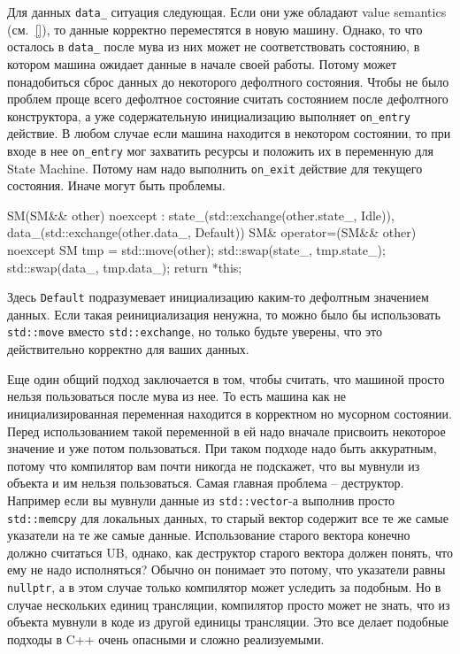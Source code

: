 \documentclass{article}
\begin{document}
{Для данных \verb"data_" ситуация следующая.
Если они уже обладают value semantics (см.~\ref{}), то данные корректно переместятся в новую машину.
Однако, то что осталось в \verb"data_" после мува из них может не соответствовать состоянию, в котором машина ожидает данные в начале своей работы.
Потому может понадобиться сброс данных до некоторого дефолтного состояния.
Чтобы не было проблем проще всего дефолтное состояние считать состоянием после дефолтного конструктора, а уже содержательную инициализацию выполняет \verb"on_entry" действие.
В любом случае если машина находится в некотором состоянии, то при входе в нее \verb"on_entry" мог захватить ресурсы и положить их в переменную для State Machine.
Потому нам надо выполнить \verb"on_exit" действие для текущего состояния.
Иначе могут быть проблемы.
\begin{cppcode}
SM(SM&& other) noexcept 
    : state_(std::exchange(other.state_, Idle{})),
      data_(std::exchange(other.data_, Default{})) {
}
SM& operator=(SM&& other) noexcept {
  SM tmp = std::move(other);
  std::swap(state_, tmp.state_);
  std::swap(data_, tmp.data_);
  return *this;
}
\end{cppcode}
Здесь \verb"Default" подразумевает инициализацию каким-то дефолтным значением данных.
Если такая реинициализация ненужна, то можно было бы использовать  \verb"std::move" вместо \verb"std::exchange", но только будьте уверены, что это действительно корректно для ваших данных.

Еще один общий подход заключается в том, чтобы считать, что  машиной просто нельзя пользоваться после мува из нее.
То есть машина как не инициализированная переменная находится в корректном но мусорном состоянии.
Перед использованием такой переменной в ей надо вначале присвоить некоторое значение и уже потом пользоваться.
При таком подходе надо быть аккуратным, потому что компилятор вам почти никогда не подскажет, что вы мувнули из объекта и им нельзя пользоваться.
Самая главная проблема -- деструктор.
Например если вы мувнули данные из \verb"std::vector"-а выполнив просто \verb"std::memcpy" для локальных данных, то старый вектор содержит все те же самые указатели на те же самые данные.
Использование старого вектора конечно должно считаться UB, однако, как деструктор старого вектора должен понять, что ему не надо исполняться?
Обычно он понимает это потому, что указатели равны \verb"nullptr", а в этом случае только компилятор может уследить за подобным.
Но в случае нескольких единиц трансляции, компилятор просто может не знать, что из объекта мувнули в коде из другой единицы трансляции.
Это все делает подобные подходы в C++ очень опасными и сложно реализуемыми.

}
\end{document}
